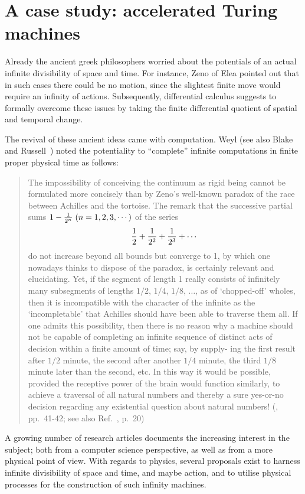 \documentclass[10pt]{article}
\begin{document}
 \section{A case study: accelerated Turing machines}


Already the ancient greek philosophers worried about the potentials of an actual infinite divisibility of space and time.
For instance, Zeno of Elea pointed out that in such cases there could be no motion,
since the slightest finite move would require an infinity of actions.
Subsequently, differential calculus suggests to formally overcome these issues by taking the finite differential
quotient of spatial and temporal change.

The revival of these ancient ideas came with computation.
Weyl (see also Blake~\cite[p.~651]{Blake26} and Russell~\cite[p.~144]{Russell-36}) noted the potentiality to ``complete'' infinite computations in
finite proper physical time as follows:
\begin{quote}
The impossibility of conceiving the continuum as rigid being cannot
be formulated more concisely than by Zeno's well-known paradox of
the race between Achilles and the tortoise. The remark that the
successive partial sums $1 - {1\over 2^n}\;  (n = 1, 2, 3, \cdots )$ of the series
$$
{1\over 2}+
{1\over 2^2}+
{1\over 2^3}+
\cdots
$$
do not increase beyond all bounds but converge to 1, by which one
nowadays thinks to dispose of the paradox, is certainly relevant and
elucidating. Yet, if the segment of length 1 really consists of infinitely
many subsegments of lengths $1/2$, $1/4$, $1/8$, $\ldots$, as of `chopped-off'
wholes, then it is incompatible with the character of the infinite as the
`incompletable' that Achilles should have been able to traverse them
all. If one admits this possibility, then there is no reason why a
machine should not be capable of completing an infinite sequence of
distinct acts of decision within a finite amount of time; say, by supply-
ing the first result after $1/2$ minute, the second after another $1/4$ minute,
the third $1/8$ minute later than the second, etc. In this way it would
be possible, provided the receptive power of the brain would function
similarly, to achieve a traversal of all natural numbers and thereby a
sure yes-or-no decision regarding any existential question about natural
numbers!
(\cite{weyl:49}, pp.~41-42; see also  Ref.~\cite{benna:64}, p.~20)
\end{quote}

A growing number of research articles documents the increasing interest in the subject;
both from a computer science perspective, as well as from a more physical point of view.
With regards to physics, several proposals exist to harness infinite divisibility of space and time, and maybe action,
and to utilise physical processes for the construction of such infinity machines.
\end{document}
